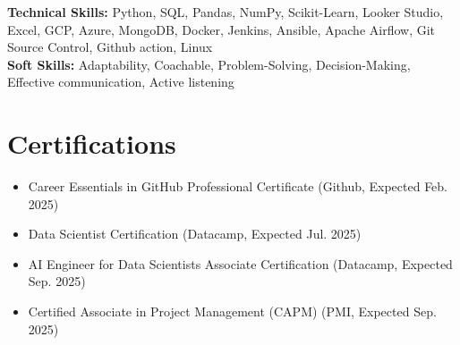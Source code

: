\documentclass[letterpaper,11pt]{article}
\begin{document}
\textbf{Technical Skills:} Python, SQL, Pandas, NumPy, Scikit-Learn, Looker Studio, Excel, GCP, Azure, MongoDB, Docker, Jenkins, Ansible, Apache Airflow, Git Source Control, Github action, Linux \\


\textbf{Soft Skills:} Adaptability, Coachable, Problem-Solving, Decision-Making, Effective communication, Active listening




\section*{Certifications}
\begin{itemize}
    
    \item Career Essentials in GitHub Professional Certificate (Github, Expected Feb. 2025)
    
    \item Data Scientist Certification (Datacamp, Expected Jul. 2025)
    
    \item AI Engineer for Data Scientists Associate Certification (Datacamp, Expected Sep. 2025)
    
    \item Certified Associate in Project Management (CAPM) (PMI, Expected Sep. 2025)
    
\end{itemize}
\end{document}
